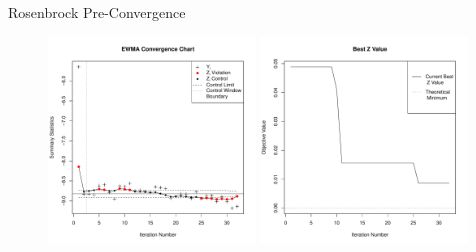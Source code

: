 \documentclass[ xcolor = pdftex, dvipsnames, table ]{beamer}
\begin{document}
\begin{frame}{Rosenbrock Pre-Convergence}
\begin{figure}[h!]%
        \includegraphics[width=0.49\textwidth]{ewmaConvChartRoseEasyEasyStart.pdf}
        \includegraphics[width=0.49\textwidth]{bestZRoseEasyEasyStart.pdf}
\end{figure}
\end{frame}
\end{document}

